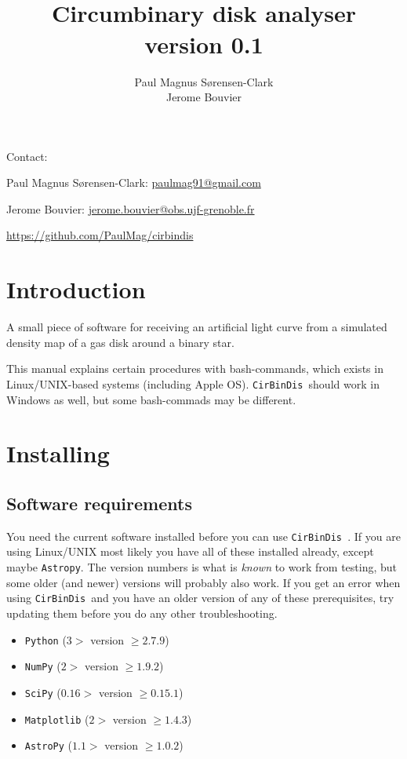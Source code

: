 \documentclass[a4paper, 12pt, english, titlepage]{article}
\title{\sname \\ Circumbinary disk analyser \\ version 0.1}
\author{Paul Magnus Sørensen-Clark \\ Jerome Bouvier}
\newcommand{\sname}{\texttt{CirBinDis }}
\begin{document}
\maketitle
\tableofcontents

\vfill
Contact:

Paul Magnus Sørensen-Clark:
\href{mailto:paulmag91@gmail.com}{paulmag91@gmail.com}

Jerome Bouvier:
\href{mailto:jerome.bouvier@obs.ujf-grenoble.fr}{jerome.bouvier@obs.ujf-grenoble.fr}

\url{https://github.com/PaulMag/cirbindis}

\clearpage


\section{Introduction}

A small piece of software for receiving an artificial light curve from a simulated density map of a gas disk around a binary star.

This manual explains certain procedures with bash-commands, which exists in Linux/UNIX-based systems (including Apple OS). \sname should work in Windows as well, but some bash-commads may be different.


\section{Installing}

\subsection{Software requirements}
    You need the current software installed before you can use \sname. 
    If you are using Linux/UNIX most likely you have all of these installed already, except maybe \texttt{Astropy}. 
    The version numbers is what is \emph{known} to work from testing, but some older (and newer) versions will probably also work. If you get an error when using \sname and you have an older version of any of these prerequisites, try updating them before you do any other troubleshooting. 
    \begin{itemize}
        \item \texttt{Python} ($3 >$ version $\geq 2.7.9$)
        \item \texttt{NumPy} ($2 >$ version $\geq 1.9.2$)
        \item \texttt{SciPy} ($0.16 >$ version $\geq 0.15.1$)
        \item \texttt{Matplotlib} ($2 >$ version $\geq 1.4.3$)
        \item \texttt{AstroPy} ($1.1 >$ version $\geq 1.0.2$)
    \end{itemize}
\end{document}
